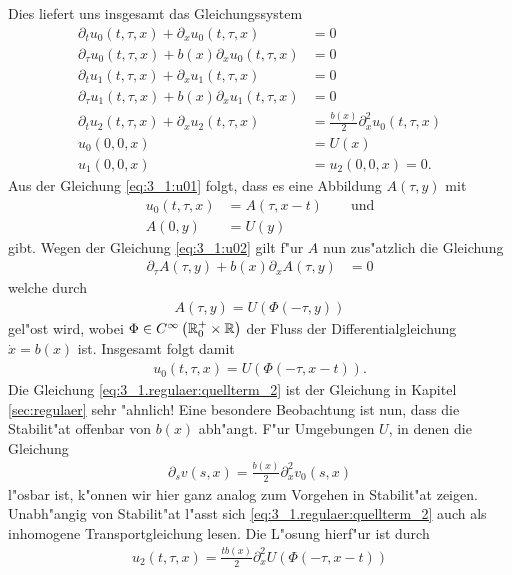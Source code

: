 Dies liefert uns insgesamt das Gleichungssystem
\begin{align}
\label{eq:3_1:u01}
\partial_t u_0(t, \tau, x) + \partial_x u_0(t, \tau, x) &= 0\\
\label{eq:3_1:u02}
\partial_\tau u_0(t, \tau, x) + b(x) \partial_x u_0(t, \tau, x) &= 0\\
\partial_t u_1(t, \tau, x) + \partial_x u_1(t, \tau, x) &= 0\\
\partial_\tau u_1(t, \tau, x) + b(x) \partial_x u_1(t, \tau, x) &= 0\\
\label{eq:3_1.regulaer:quellterm_2}
\partial_t u_2(t, \tau, x) + \partial_x u_2(t, \tau, x) &= \frac{b(x)}{2} \partial^2_x u_0(t, \tau,x)\\
u_0(0,0,x) &= U(x)\\
u_1(0,0,x) &= u_2(0,0,x) = 0.
\end{align}
Aus der Gleichung \eqref{eq:3_1:u01} folgt, dass es eine Abbildung $A(\tau,y)$ mit
\begin{align}
u_0(t,\tau,x) &= A(\tau,x-t) \qquad \text{und}\\
A(0,y) &= U(y)
\end{align}
gibt.
Wegen der Gleichung \eqref{eq:3_1:u02} gilt f"ur $A$ nun zus"atzlich die Gleichung
\begin{align}
\partial_\tau A(\tau, y) + b(x) \partial_x A(\tau, y) &= 0
\end{align}
welche durch
\begin{align}
A(\tau, y) = U(\Phi(-\tau, y))
\end{align}
gel"ost wird, wobei $\Phi \in C^\infty\left(\mathbb R^+_0 \times \mathbb R \right)$ der Fluss der Differentialgleichung $\dot x = b(x)$ ist.
Insgesamt folgt damit
\begin{align}
u_0(t,\tau,x) = U(\Phi(-\tau, x- t)).
\end{align}
Die Gleichung \eqref{eq:3_1.regulaer:quellterm_2} ist der Gleichung in Kapitel \ref{sec:regulaer} sehr "ahnlich!
Eine besondere Beobachtung ist nun, dass die Stabilit"at offenbar von $b(x)$ abh"angt.
F"ur Umgebungen $U$, in denen die Gleichung
\begin{align}
\partial_s v(s,x) = \frac{b(x)}{2} \partial^2_x v_0(s,x)
\end{align}
l"osbar ist, k"onnen wir hier ganz analog zum Vorgehen in \cite{Junk2004} Stabilit"at zeigen.
Unabh"angig von Stabilit"at l"asst sich \eqref{eq:3_1.regulaer:quellterm_2} auch als inhomogene Transportgleichung lesen.
Die L"osung hierf"ur ist durch
\begin{align}
u_2(t, \tau, x) = \frac{t b(x)}{2} \partial^2_x U(\Phi(-\tau, x- t))
\end{align}
